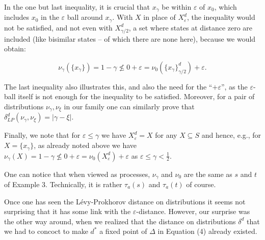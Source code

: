 \documentclass[10pt,a4paper]{article}
\begin{document}
In the one but last inequality, it is crucial that $x_{\gamma}$ be within $\varepsilon$ of $x_{0}$, which includes $x_{0}$ in the $\varepsilon$ ball around $x_{\gamma}$. With $X$ in place of $X^{d}_{\varepsilon}$, the inequality would not be satisfied, and not even with $X^{d}_{\gamma/2}$, a set where states at distance zero are included (like bisimilar states – of which there are none here), because we would obtain:\par
  
\par  \quad  \[\nu_{\gamma}(\{x_{\gamma}\})=1-\gamma\not\leq 0+\varepsilon=\nu_{0}(\{x_{\gamma}\}^{d}_{\gamma/2})+\varepsilon.\]\quad  \quad  
  
The last inequality also illustrates this, and also the need for the “$+\varepsilon$”, as the $\varepsilon$-ball itself is not enough for the inequality to be satisfied. Moreover, for a pair of distributions $\nu_{\gamma},\nu_{\xi}$ in our family one can similarly prove that $\delta^{d}_{LP}(\nu_{\gamma},\nu_{\xi})=|\gamma-\xi|$.\par
 
 
 
Finally, we note that for $\varepsilon\leq\gamma$ we have $X_{\varepsilon}^{d}=X$ for any $X\subseteq S$ and hence, e.g., for $X=\{x_{\gamma}\}$, as already noted above we have $\nu_{\gamma}(X)=1-\gamma\not\leq 0+\varepsilon=\nu_{0}(X^{d}_{\varepsilon})+\varepsilon$ as $\varepsilon\leq\gamma<\frac{1}{2}$.\par
 
 
 
 
One can notice that when viewed as processes, $\nu_{\gamma}$ and $\nu_{0}$ are the same as $s$ and $t$ of Example 3. Technically, it is rather $\tau_{a}(s)$ and $\tau_{a}(t)$ of course.\par
 
 
 
Once one has seen the Lévy-Prokhorov distance on distributions it seems not surprising that it has some link with the $\varepsilon$-distance. However, our surprise was the other way around, when we realized that the distance on distributions $\delta^{d}$ that we had to concoct to make $d^{*}$ a fixed point of $\Delta$ in Equation (4) already existed.\par
 
\end{document}
